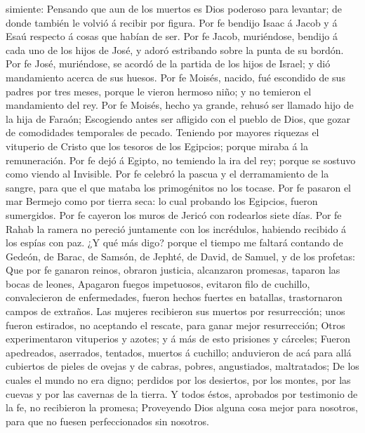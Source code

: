 simiente:  Pensando que aun de los muertos es Dios
poderoso para levantar; de donde también le volvió á recibir por figura.
 Por fe bendijo Isaac á Jacob y á Esaú respecto á cosas
que habían de ser.  Por fe Jacob, muriéndose, bendijo á
cada uno de los hijos de José, y adoró estribando sobre la punta de su
bordón.  Por fe José, muriéndose, se acordó de la partida
de los hijos de Israel; y dió mandamiento acerca de sus huesos.
 Por fe Moisés, nacido, fué escondido de sus padres por
tres meses, porque le vieron hermoso niño; y no temieron el mandamiento
del rey.  Por fe Moisés, hecho ya grande, rehusó ser
llamado hijo de la hija de Faraón;  Escogiendo antes ser
afligido con el pueblo de Dios, que gozar de comodidades temporales de
pecado.  Teniendo por mayores riquezas el vituperio de
Cristo que los tesoros de los Egipcios; porque miraba á la remuneración.
 Por fe dejó á Egipto, no temiendo la ira del rey; porque
se sostuvo como viendo al Invisible.  Por fe celebró la
pascua y el derramamiento de la sangre, para que el que mataba los
primogénitos no los tocase.  Por fe pasaron el mar
Bermejo como por tierra seca: lo cual probando los Egipcios, fueron
sumergidos.  Por fe cayeron los muros de Jericó con
rodearlos siete días.  Por fe Rahab la ramera no pereció
juntamente con los incrédulos, habiendo recibido á los espías con paz.
 ¿Y qué más digo? porque el tiempo me faltará contando de
Gedeón, de Barac, de Samsón, de Jephté, de David, de Samuel, y de los
profetas:  Que por fe ganaron reinos, obraron justicia,
alcanzaron promesas, taparon las bocas de leones, 
Apagaron fuegos impetuosos, evitaron filo de cuchillo, convalecieron de
enfermedades, fueron hechos fuertes en batallas, trastornaron campos de
extraños.  Las mujeres recibieron sus muertos por
resurrección; unos fueron estirados, no aceptando el rescate, para ganar
mejor resurrección;  Otros experimentaron vituperios y
azotes; y á más de esto prisiones y cárceles;  Fueron
apedreados, aserrados, tentados, muertos á cuchillo; anduvieron de acá
para allá cubiertos de pieles de ovejas y de cabras, pobres,
angustiados, maltratados;  De los cuales el mundo no era
digno; perdidos por los desiertos, por los montes, por las cuevas y por
las cavernas de la tierra.  Y todos éstos, aprobados por
testimonio de la fe, no recibieron la promesa; 
Proveyendo Dios alguna cosa mejor para nosotros, para que no fuesen
perfeccionados sin nosotros.

